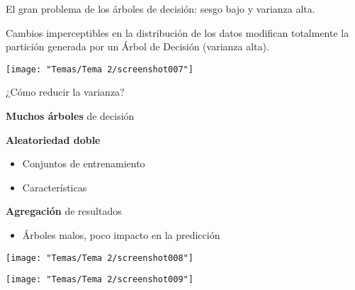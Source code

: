 El gran problema de los árboles de decisión: sesgo bajo y varianza alta.

Cambios imperceptibles en la distribución de los datos modifican totalmente la partición generada por un Árbol de Decisión (varianza alta).

\begin{center}
	\texttt{[image: "Temas/Tema 2/screenshot007"]}
	
	¿Cómo reducir la varianza?
\end{center}

\textbf{Muchos árboles} de decisión

\textbf{Aleatoriedad doble}
\begin{itemize}
	\item Conjuntos de entrenamiento 
\item Características 
\end{itemize}
\textbf{Agregación} de resultados 
\begin{itemize}
	\item Árboles malos, poco impacto en la predicción
\end{itemize}
\begin{center}
	\texttt{[image: "Temas/Tema 2/screenshot008"]}
	
	\texttt{[image: "Temas/Tema 2/screenshot009"]}
\end{center}

